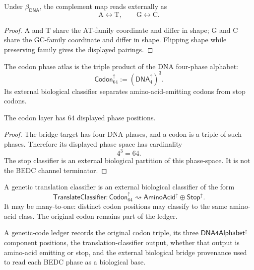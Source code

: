 \begin{corollary}
\label{cor:philosophy-watson-crick-product-axis-flip}
Under $\beta_{\mathsf{DNA}}$, the complement map reads externally as
$$
  \mathrm{A}\leftrightarrow\mathrm{T},
  \qquad
  \mathrm{G}\leftrightarrow\mathrm{C}.
$$
\end{corollary}
\begin{proof}
$\mathrm{A}$ and $\mathrm{T}$ share the AT-family coordinate and differ
in shape; $\mathrm{G}$ and $\mathrm{C}$ share the GC-family coordinate
and differ in shape. Flipping shape while preserving family gives the
displayed pairings.
\end{proof}

\begin{definition}
\label{def:philosophy-codon-phase-atlas}
The codon phase atlas is the triple product of the DNA four-phase
alphabet:
$$
  \mathsf{Codon}_{64}^{\uparrow}
  :=
  (\mathsf{DNA}_{4}^{\uparrow})^{3}.
$$
Its external biological classifier separates amino-acid-emitting codons
from stop codons.
\end{definition}

\begin{corollary}
\label{cor:philosophy-codon-phase-space-bridge}
The codon layer has $64$ displayed phase positions.
\end{corollary}
\begin{proof}
The bridge target has four DNA phases, and a codon is a triple of such
phases. Therefore its displayed phase space has cardinality
$$
  4^{3}=64.
$$
The stop classifier is an external biological partition of this
phase-space. It is not the BEDC channel terminator.
\end{proof}

\begin{definition}
\label{def:philosophy-genetic-translation-classifier}
A genetic translation classifier is an external biological classifier
of the form
$$
  \mathsf{TranslateClassifier}
  :
  \mathsf{Codon}_{64}^{\uparrow}
  \rightsquigarrow
  \mathsf{AminoAcid}^{\uparrow}\oplus\mathsf{Stop}^{\uparrow}.
$$
It may be many-to-one: distinct codon positions may classify to the
same amino-acid class. The original codon remains part of the ledger.
\end{definition}

\begin{definition}
\label{def:philosophy-genetic-code-ledger}
A genetic-code ledger records the original codon triple, its three
$\mathsf{DNA4Alphabet}^{\uparrow}$ component positions, the
translation-classifier output, whether that output is amino-acid
emitting or stop, and the external biological bridge provenance used to
read each BEDC phase as a biological base.
\end{definition}

